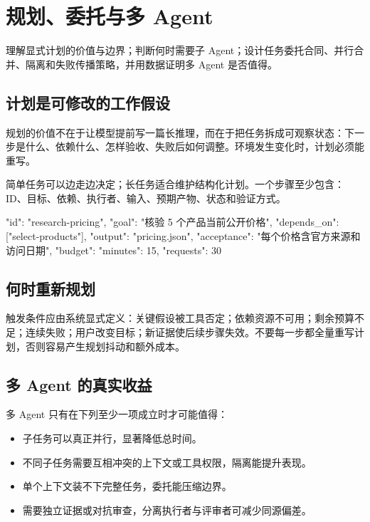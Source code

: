 \chapter{规划、委托与多 Agent}
\label{chap:multi-agent}

\begin{takeaway}[学习目标]
理解显式计划的价值与边界；判断何时需要子 Agent；设计任务委托合同、并行合并、隔离和失败传播策略，并用数据证明多 Agent 是否值得。
\end{takeaway}

\section{计划是可修改的工作假设}

规划的价值不在于让模型提前写一篇长推理，而在于把任务拆成可观察状态：下一步是什么、依赖什么、怎样验收、失败后如何调整。环境发生变化时，计划必须能重写。

简单任务可以边走边决定；长任务适合维护结构化计划。一个步骤至少包含：ID、目标、依赖、执行者、输入、预期产物、状态和验证方式。

\begin{codeblock}
{
  "id": "research-pricing",
  "goal": "核验 5 个产品当前公开价格",
  "depends_on": ["select-products"],
  "output": "pricing.json",
  "acceptance": "每个价格含官方来源和访问日期",
  "budget": {"minutes": 15, "requests": 30}
}
\end{codeblock}

\section{何时重新规划}

触发条件应由系统显式定义：关键假设被工具否定；依赖资源不可用；剩余预算不足；连续失败；用户改变目标；新证据使后续步骤失效。不要每一步都全量重写计划，否则容易产生规划抖动和额外成本。

\section{多 Agent 的真实收益}

多 Agent 只有在下列至少一项成立时才可能值得：

\begin{itemize}
  \item 子任务可以真正并行，显著降低总时间。
  \item 不同子任务需要互相冲突的上下文或工具权限，隔离能提升表现。
  \item 单个上下文装不下完整任务，委托能压缩边界。
  \item 需要独立证据或对抗审查，分离执行者与评审者可减少同源偏差。
\end{itemize}


